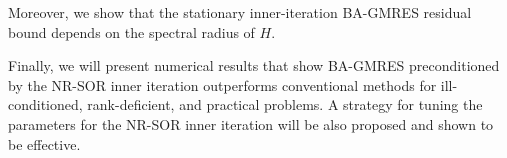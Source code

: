 \documentclass{report}
\begin{document}
Moreover, we show that the stationary inner-iteration BA-GMRES residual
bound depends on the spectral radius of $H$.

Finally, we will present numerical results that show BA-GMRES
preconditioned by the NR-SOR inner iteration outperforms conventional
methods for ill-conditioned, rank-deficient, and practical problems.
A strategy for tuning the parameters for the NR-SOR inner iteration will
be also proposed and shown to be effective.
\end{document}
